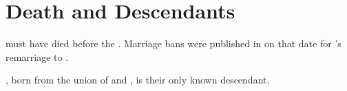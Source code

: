 \section[Death and Descendants]{Death and Descendants}
\label{sec: Death and Descendants}

\mcdonaldJNameOnly{} must have died before the . Marriage bans were published in \grahamstown{} on that date for \welchMName{}'s remarriage to \henmanRName{}.

\mcdonaldAName{}, born from the union of \mcdonaldJName{} and \welchMName{}, is their only known descendant.